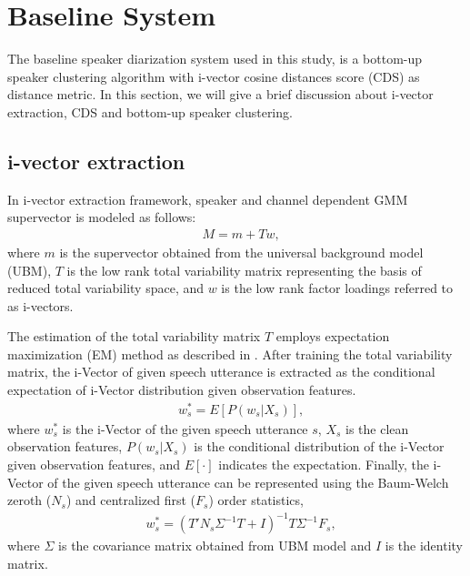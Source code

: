 \documentclass[journal,10pt]{IEEEtran}
\begin{document}
\section{Baseline System}
\label{bs}
The baseline speaker diarization system used in this study, is a bottom-up speaker clustering algorithm with i-vector cosine distances score (CDS) as distance metric. In this section, we will give a brief discussion about i-vector extraction, CDS and bottom-up speaker clustering. 

\subsection{i-vector extraction}
In i-vector extraction framework, speaker and channel dependent GMM supervector is modeled as follows:
\begin{equation}
\begin{aligned}
& M=m+Tw,
\label{mmtw}
\end{aligned}
\end{equation}
where $m$ is the supervector obtained from the universal background model (UBM), 
$T$ is the low rank total variability matrix representing the basis of reduced total variability space, 
and $w$ is the low rank factor loadings referred to as i-vectors. 

The estimation of the total variability matrix $T$ employs expectation maximization (EM) method as described in \cite{kenny2005eigenvoice}. 
After training the total variability matrix, 
the i-Vector of given speech utterance is extracted as the conditional expectation of i-Vector distribution given observation features.
\begin{equation}
\begin{aligned}
&w_{s}^{\ast}=E[P(w_{s}|X_{s})],
\label{eq:ws}
\end{aligned}
\end{equation}
where $w_{s}^{\ast}$ is the i-Vector of the given speech utterance $s$, 
$X_{s}$ is the clean observation features, 
$P(w_{s}|X_{s})$ is the conditional distribution of the i-Vector given observation features, 
and $E[\cdot]$ indicates the expectation. 
Finally, the i-Vector of the given speech utterance can be represented using the Baum-Welch zeroth ($N_s$) and centralized first ($F_s$) order statistics,
\begin{equation}
\begin{aligned}
&w_{s}^{\ast}=(T'N_{s}\Sigma^{-1}T+I)^{-1}T\Sigma^{-1}F_{s},
\label{ws2}
\end{aligned}
\end{equation}
where $\Sigma$ is the covariance matrix obtained from UBM model and $I$ is the identity matrix.
\end{document}
